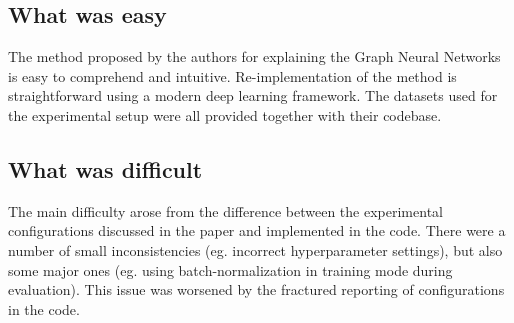 
\subsection*{What was easy}

The method proposed by the authors for explaining the Graph Neural Networks is easy to comprehend and intuitive. Re-implementation of the method is straightforward using a modern deep learning framework. The datasets used for the experimental setup were all provided together with their codebase. 


\subsection*{What was difficult}

The main difficulty arose from the difference between the experimental configurations discussed in the paper and implemented in the code. There were a number of small inconsistencies (eg. incorrect hyperparameter settings), but also some major ones (eg. using batch-normalization in training mode during evaluation). This issue was worsened by the fractured reporting of configurations in the code. 


